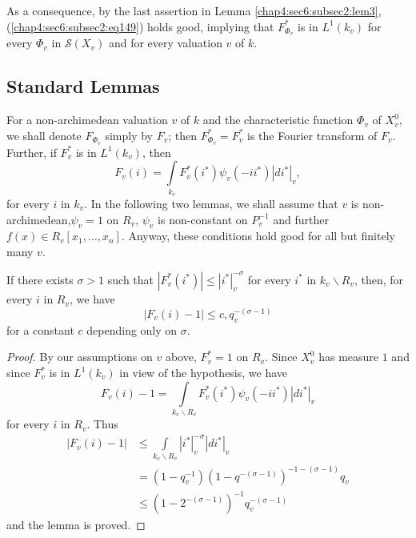As a consequence, by the last assertion in Lemma
\ref{chap4:sec6:subsec2:lem3}, 
(\ref{chap4:sec6:subsec2:eq149}) holds good, implying that
$F^{\ast}_{\Phi_{v}}$ is in 
$L^{1}(k_{v})$ for every $\Phi_{v}$ in $\mathscr{S}(X_{v})$ and for every
valuation $v$ of $k$.

\subsection{Standard Lemmas}\label{chap4:sec6:subsec3} %

For a non-archimedean valuation $v$ of $k$ and the characteristic
function $\Phi_{v}$ of $X^{0}_{v}$, we shall denote $F_{\Phi_{v}}$
simply by $F_{v}$; then $F^{\ast}_{\Phi_{v}}=F^{\ast}_{v}$ is the
Fourier transform of $F_{v}$. Further, if $F^{\ast}_{v}$ is in
$L^{1}(k_{v})$, then
$$
F_{v}(i)=\int\limits_{k_{v}}F^{\ast}_{v}(i^{\ast})\psi_{v}(-ii^{\ast})|di^{\ast}|_{v}, 
$$
for every $i$ in $k_{v}$. In the following two lemmas, we shall assume
that $v$ is non-archimedean,\pageoriginale $\psi_{v}=1$ on $R_{v}$,
$\psi_{v}$ is non-constant on $P^{-1}_{v}$ and further $f(x)\in
R_{v}[x_{1},\ldots,x_{n}]$. Anyway, these conditions hold good for all
but finitely many $v$.

\setcounter{lemma}{4}
\begin{lemma}\label{chap4:sec6:subsec3:lem5} %
  If there exists $\sigma>1$ such that $|F^{\ast}_{v}(i^{\ast})|\leq
  |i^{\ast}|^{-\sigma}_{v}$ for every $i^{\ast}$ in $k_{v}\backslash
  R_{v}$, then, for every $i$ in $R_{v}$, we have
  $$
  |F_{v}(i)-1|\leq c, q^{-(\sigma-1)}_{v}
  $$
  for a constant $c$ depending only on $\sigma$.
\end{lemma}

\begin{proof}
By our assumptions on $v$ above, $F^{\ast}_{v}=1$ on $R_{v}$. Since
$X^{0}_{v}$ has measure $1$ and since $F^{\ast}_{v}$ is in
$L^{1}(k_{v})$ in view of the hypothesis, we have
$$
F_{v}(i)-1=\int\limits_{k_{v}\backslash
  R_{v}}F^{\ast}_{v}(i^{\ast})\psi_{v}(-ii^{\ast})|di^{\ast}|_{v}
$$
for every $i$ in $R_{v}$. Thus
\begin{align*}
|F_{v}(i)-1| &\leq \int\limits_{k_{v}\backslash
  R_{v}}|i^{\ast}|^{-\sigma}_{v}|di^{\ast}|_v\\
&=(1-q^{-1}_{v})(1-q^{-(\sigma-1)})^{-1-(\sigma-1)}q_{v}\\
&\leq (1-2^{-(\sigma-1)})^{-1}q^{-(\sigma-1)}_{v}
\end{align*}
and the lemma is proved.
\end{proof}

